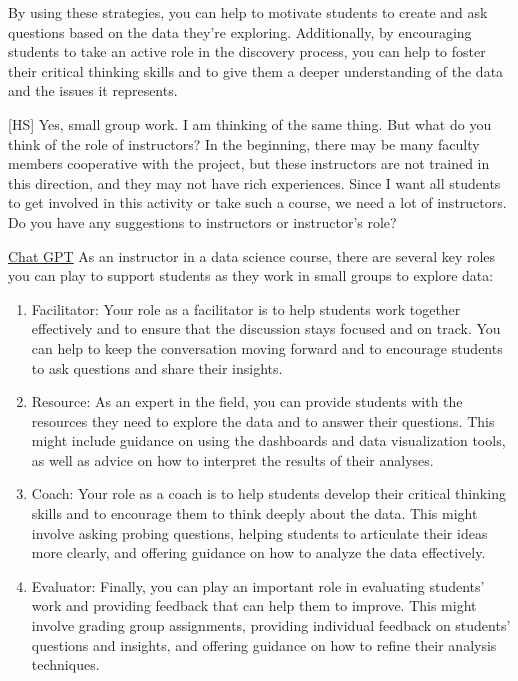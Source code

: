 \documentclass[
]{book}
\providecommand{\tightlist}{%
  \setlength{\itemsep}{0pt}\setlength{\parskip}{0pt}}
\theoremstyle{definition}
\theoremstyle{definition}
\theoremstyle{definition}
\theoremstyle{definition}
\theoremstyle{remark}
\begin{document}
By using these strategies, you can help to motivate students to create and ask questions based on the data they're exploring. Additionally, by encouraging students to take an active role in the discovery process, you can help to foster their critical thinking skills and to give them a deeper understanding of the data and the issues it represents.

{[}HS{]} Yes, small group work. I am thinking of the same thing. But what do you think of the role of instructors? In the beginning, there may be many faculty members cooperative with the project, but these instructors are not trained in this direction, and they may not have rich experiences. Since I want all students to get involved in this activity or take such a course, we need a lot of instructors. Do you have any suggestions to instructors or instructor's role?

\protect\hyperlink{chatgpt}{Chat GPT} As an instructor in a data science course, there are several key roles you can play to support students as they work in small groups to explore data:

\begin{enumerate}
\def\labelenumi{\arabic{enumi}.}
\tightlist
\item
  Facilitator: Your role as a facilitator is to help students work together effectively and to ensure that the discussion stays focused and on track. You can help to keep the conversation moving forward and to encourage students to ask questions and share their insights.
\item
  Resource: As an expert in the field, you can provide students with the resources they need to explore the data and to answer their questions. This might include guidance on using the dashboards and data visualization tools, as well as advice on how to interpret the results of their analyses.
\item
  Coach: Your role as a coach is to help students develop their critical thinking skills and to encourage them to think deeply about the data. This might involve asking probing questions, helping students to articulate their ideas more clearly, and offering guidance on how to analyze the data effectively.
\item
  Evaluator: Finally, you can play an important role in evaluating students' work and providing feedback that can help them to improve. This might involve grading group assignments, providing individual feedback on students' questions and insights, and offering guidance on how to refine their analysis techniques.
\end{enumerate}
\end{document}

